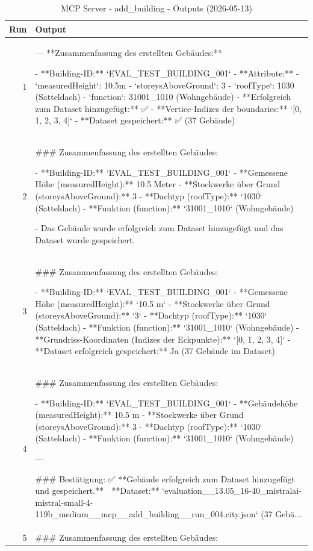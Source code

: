 \documentclass[a4paper,11pt]{article}
\begin{document}
\begin{table}[ht]
\centering
\scriptsize
\caption{MCP Server - add\_building - Outputs (2026-05-13)}
\label{tab:mcp\_add\_building\_outputs\_2026-05-13}
\begin{tabular}{r p{12cm}}
\hline
Run & Output \\
\hline
1 & ---
**Zusammenfassung des erstellten Gebäudes:**

- **Building-ID:** `EVAL\_TEST\_BUILDING\_001`
- **Attribute:**
  - `measuredHeight`: 10.5m
  - `storeysAboveGround`: 3
  - `roofType`: 1030 (Satteldach)
  - `function`: 31001\_1010 (Wohngebäude)
- **Erfolgreich zum Dataset hinzugefügt:** ✅
- **Vertice-Indizes der boundaries:** `[0, 1, 2, 3, 4]`
- **Dataset gespeichert:** ✅ (37 Gebäude) \\
2 & \#\#\# Zusammenfassung des erstellten Gebäudes:

- **Building-ID:** `EVAL\_TEST\_BUILDING\_001`
- **Gemessene Höhe (measuredHeight):** 10.5 Meter
- **Stockwerke über Grund (storeysAboveGround):** 3
- **Dachtyp (roofType):** `1030` (Satteldach)
- **Funktion (function):** `31001\_1010` (Wohngebäude)

- Das Gebäude wurde erfolgreich zum Dataset hinzugefügt und das Dataset wurde gespeichert. \\
3 & \#\#\# Zusammenfassung des erstellten Gebäudes:

- **Building-ID:** `EVAL\_TEST\_BUILDING\_001`
- **Gemessene Höhe (measuredHeight):** `10.5 m`
- **Stockwerke über Grund (storeysAboveGround):** `3`
- **Dachtyp (roofType):** `1030` (Satteldach)
- **Funktion (function):** `31001\_1010` (Wohngebäude)
- **Grundriss-Koordinaten (Indizes der Eckpunkte):** `[0, 1, 2, 3, 4]`
- **Dataset erfolgreich gespeichert:** Ja (37 Gebäude im Dataset) \\
4 & \#\#\# Zusammenfassung des erstellten Gebäudes:

- **Building-ID:** `EVAL\_TEST\_BUILDING\_001`
- **Gebäudehöhe (measuredHeight):** 10.5 m
- **Stockwerke über Grund (storeysAboveGround):** 3
- **Dachtyp (roofType):** `1030` (Satteldach)
- **Funktion (function):** `31001\_1010` (Wohngebäude)

---

\#\#\# Bestätigung:
✅ **Gebäude erfolgreich zum Dataset hinzugefügt und gespeichert.**
📁 **Dataset:** `evaluation\_\_13.05\_16-40\_mistralai-mistral-small-4-119b\_medium\_\_mcp\_\_add\_building\_\_run\_004.city.json` (37 Gebä... \\
5 & \#\#\# Zusammenfassung des erstellten Gebäudes:


\end{tabular}
\end{table}
\end{document}
